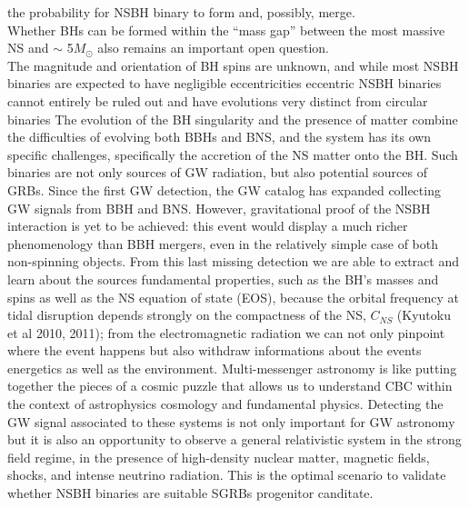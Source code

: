 \documentclass[binding=0.6cm, LaM]{sapthesis}
\begin{document}
        the probability for NSBH binary to form and, possibly, merge. \\
        Whether BHs can be formed within the “mass gap” between the most massive NS
        and $\sim$ 5$M_{\odot}$ also remains an important open question. \\
        The magnitude and orientation of BH spins are unknown, and while most NSBH binaries
        are expected to have negligible eccentricities %
        eccentric NSBH binaries cannot entirely be ruled out
        and have evolutions very distinct from circular binaries %
        The evolution of the BH singularity and the presence of matter combine
        the difficulties of evolving both BBHs and BNS, and the system has its own specific challenges,
        specifically the accretion of the NS matter onto the BH.
        Such binaries are not only sources of GW radiation, but also potential sources of GRBs.
        Since the first GW detection, the GW catalog has expanded collecting GW signals from BBH and BNS.
        However, gravitational proof of the NSBH interaction is yet to be achieved:
        this event would display a much richer phenomenology than BBH mergers,
        even in the relatively simple case of both non-spinning objects.
        From this last missing detection we are able to extract and learn about
        the sources fundamental properties, such as the BH’s masses and spins
        as well as the NS equation of state (EOS), because the orbital frequency at tidal disruption
        depends strongly on the compactness of the NS, $C_{NS}$ (Kyutoku et al 2010, 2011);
        from the electromagnetic radiation we can not only
        pinpoint where the event happens but also withdraw informations about the events energetics as well as the environment.
        Multi-messenger astronomy is like putting together the pieces of a cosmic puzzle
        that allows us to understand CBC within the context of astrophysics cosmology and fundamental physics.
        Detecting the GW signal associated to these systems is not only important for
        GW astronomy but it is also an opportunity to observe a general relativistic system in the strong field regime,
        in the presence of high-density nuclear matter, magnetic fields, shocks, and intense neutrino radiation.
        This is the optimal scenario to validate whether NSBH binaries are suitable SGRBs progenitor canditate.
\end{document}
